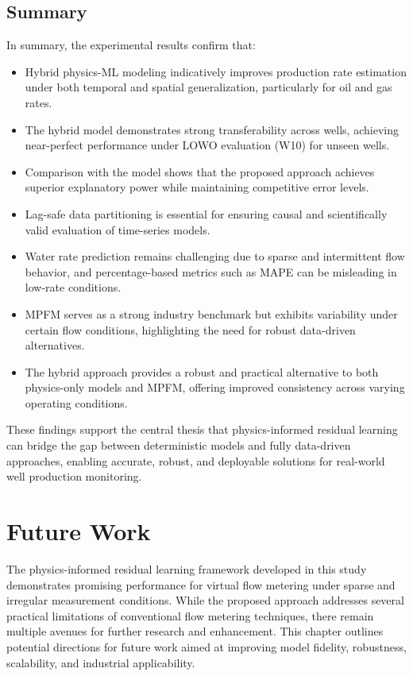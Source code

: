 \documentclass[12pt,APA]{uomthesis}
\begin{document}
\section{Summary}
In summary, the experimental results confirm that:
\begin{itemize}
    \item Hybrid physics-ML modeling indicatively improves production rate estimation under both temporal and spatial generalization, particularly for oil and gas rates.
    \item The hybrid model demonstrates strong transferability across wells, achieving near-perfect performance under LOWO evaluation (W10) for unseen wells.
    \item Comparison with the \citep{nemoto2023cloud} model shows that the proposed approach achieves superior explanatory power while maintaining competitive error levels.
    \item Lag-safe data partitioning is essential for ensuring causal and scientifically valid evaluation of time-series models.
    \item Water rate prediction remains challenging due to sparse and intermittent flow behavior, and percentage-based metrics such as MAPE can be misleading in low-rate conditions.
    \item MPFM serves as a strong industry benchmark but exhibits variability under certain flow conditions, highlighting the need for robust data-driven alternatives.
    \item The hybrid approach provides a robust and practical alternative to both physics-only models and MPFM, offering improved consistency across varying operating conditions.
\end{itemize}

These findings support the central thesis that physics-informed residual learning can bridge the gap between deterministic models and fully data-driven approaches, enabling accurate, robust, and deployable solutions for real-world well production monitoring.

\chapter{Future Work}
\label{ch:future_work}

The physics-informed residual learning framework developed in this study demonstrates promising performance for virtual flow metering under sparse and irregular measurement conditions. While the proposed approach addresses several practical limitations of conventional flow metering techniques, there remain multiple avenues for further research and enhancement. This chapter outlines potential directions for future work aimed at improving model fidelity, robustness, scalability, and industrial applicability.
\end{document}
